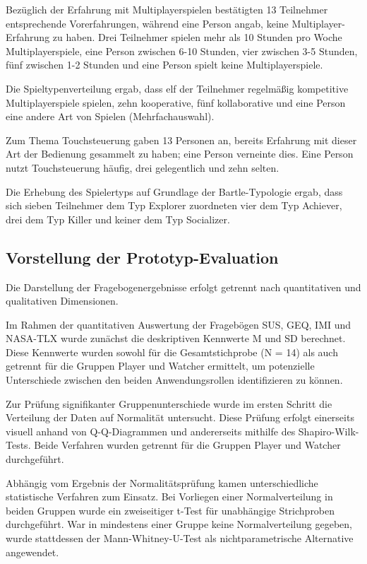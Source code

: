 Bezüglich der Erfahrung mit Multiplayerspielen bestätigten 13 Teilnehmer entsprechende Vorerfahrungen, während eine Person angab, keine Multiplayer-Erfahrung zu haben. Drei Teilnehmer spielen mehr als 10 Stunden pro Woche Multiplayerspiele, eine Person zwischen 6-10 Stunden, vier zwischen 3-5 Stunden, fünf zwischen 1-2 Stunden und eine Person spielt keine Multiplayerspiele.

Die Spieltypenverteilung ergab, dass elf der Teilnehmer regelmäßig kompetitive Multiplayerspiele spielen, zehn kooperative, fünf kollaborative und eine Person eine andere Art von Spielen (Mehrfachauswahl).

Zum Thema Touchsteuerung gaben 13 Personen an, bereits Erfahrung mit dieser Art der Bedienung gesammelt zu haben; eine Person verneinte dies. Eine Person nutzt Touchsteuerung häufig, drei gelegentlich und zehn selten.

Die Erhebung des Spielertyps auf Grundlage der Bartle-Typologie ergab, dass sich sieben Teilnehmer dem Typ Explorer zuordneten vier dem Typ Achiever, drei dem Typ Killer und keiner dem Typ Socializer.

\subsection{Vorstellung der Prototyp-Evaluation}

Die Darstellung der Fragebogenergebnisse erfolgt getrennt nach quantitativen und qualitativen Dimensionen.

Im Rahmen der quantitativen Auswertung der Fragebögen  \ac{SUS}, \ac{GEQ}, \ac{IMI} und \ac{NASA-TLX} wurde zunächst die deskriptiven Kennwerte \ac{M} und \ac{SD} berechnet. Diese Kennwerte wurden sowohl für die Gesamtstichprobe (N = 14) als auch getrennt für die Gruppen Player und Watcher ermittelt, um potenzielle Unterschiede zwischen den beiden Anwendungsrollen identifizieren zu können.

Zur Prüfung signifikanter Gruppenunterschiede wurde im ersten Schritt die Verteilung der Daten auf Normalität untersucht. Diese Prüfung erfolgt einerseits visuell anhand von \ac{Q-Q}-Diagrammen und andererseits mithilfe des Shapiro-Wilk-Tests. Beide Verfahren wurden getrennt für die Gruppen Player und Watcher durchgeführt.

Abhängig vom Ergebnis der Normalitätsprüfung kamen unterschiedliche statistische Verfahren zum Einsatz. Bei Vorliegen einer Normalverteilung in beiden Gruppen wurde ein zweiseitiger t-Test für unabhängige Strichproben durchgeführt. War in mindestens einer Gruppe keine Normalverteilung gegeben, wurde stattdessen der Mann-Whitney-U-Test als nichtparametrische Alternative angewendet.

